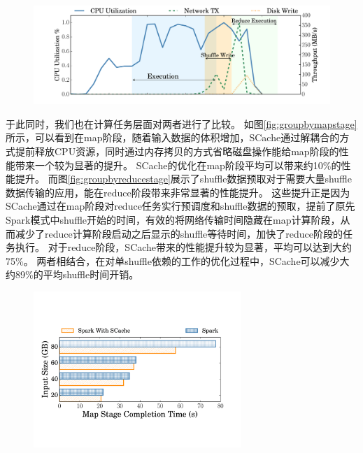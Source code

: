 \begin{figure}[!htp]
	\centering
	\includegraphics[width=\textwidth]{../../PPoPP-2018/fig/scache_util.pdf}
\end{figure}

于此同时，我们也在计算任务层面对两者进行了比较。
如图\ref{fig:groupbymapstage}所示，可以看到在map阶段，随着输入数据的体积增加，SCache通过解耦合的方式提前释放CPU资源，同时通过内存拷贝的方式省略磁盘操作能给map阶段的性能带来一个较为显著的提升。
SCache的优化在map阶段平均可以带来约10\%的性能提升。
而图\ref{fig:groupbyreducestage}展示了shuffle数据预取对于需要大量shuffle数据传输的应用，能在reduce阶段带来非常显著的性能提升。
这些提升正是因为SCache通过在map阶段对reduce任务实行预调度和shuffle数据的预取，提前了原先Spark模式中shuffle开始的时间，有效的将网络传输时间隐藏在map计算阶段，从而减少了reduce计算阶段启动之后显示的shuffle等待时间，加快了reduce阶段的任务执行。
对于reduce阶段，SCache带来的性能提升较为显著，平均可以达到大约75\%。
两者相结合，在对单shuffle依赖的工作的优化过程中，SCache可以减少大约89\%的平均shuffle时间开销。

\begin{figure}[!htp]
	\centering
	\includegraphics[width=0.7\textwidth]{../../PPoPP-2018/fig/groupbymapstage.pdf}
\end{figure}

